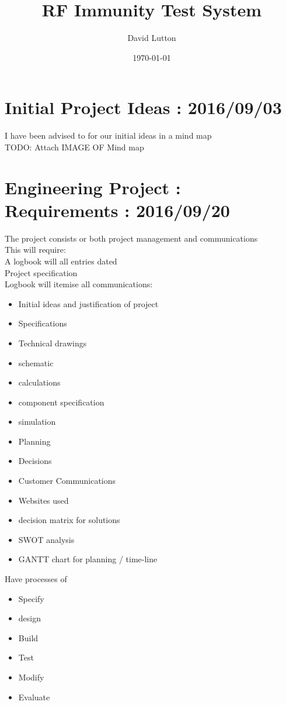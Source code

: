 \documentclass[a4paper]{article}
\title{RF Immunity Test System}
\author{David Lutton}
\date{\today}
\begin{document}
\maketitle\tableofcontents
\newpage


\section{Initial Project Ideas : 2016/09/03}
I have been advised to for our initial ideas in a mind map\\
TODO: Attach IMAGE OF Mind map\\

\section{Engineering Project : Requirements : 2016/09/20}
The project consists or both project management and communications\\
This will require:\\
A logbook will all entries dated\\
Project specification\\
Logbook will itemise all communications:
\begin{itemize}
  \item Initial ideas and justification of project
  \item Specifications
  \item Technical drawings
  \item schematic
  \item calculations
  \item component specification
  \item simulation
  \item Planning
  \item Decisions
  \item Customer Communications
  \item Websites used
  \item decision matrix for solutions
  \item SWOT analysis
  \item GANTT chart for planning / time-line
\end{itemize}


Have processes of

\begin{itemize}
  \item Specify
  \item design
  \item Build
  \item Test
  \item Modify
  \item Evaluate
\end{itemize}
\end{document}
